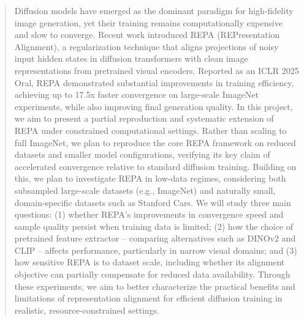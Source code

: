 \begin{abstract}
Diffusion models have emerged as the dominant paradigm for high-fidelity image generation, yet their training remains
computationally expensive and slow to converge. Recent work introduced REPA (REPresentation Alignment), a regularization
technique that aligns projections of noisy input hidden states in diffusion transformers with clean image representations
from pretrained visual encoders. Reported as an ICLR 2025 Oral, REPA demonstrated substantial improvements in training
efficiency, achieving up to 17.5x faster convergence on large-scale ImageNet experiments, while also
improving final generation quality.
In this project, we aim to present a partial reproduction and systematic extension of REPA under constrained computational settings.
Rather than scaling to full ImageNet, we plan to reproduce the core REPA framework on reduced datasets and smaller model configurations, verifying
its key claim of accelerated convergence relative to standard diffusion training. Building on this, we plan to investigate REPA in low-data
regimes, considering both subsampled large-scale datasets (e.g., ImageNet) and naturally small, domain-specific datasets such as Stanford Cars.
We will study three main questions: (1) whether REPA's improvements in convergence speed and sample quality persist when training data is
limited; (2) how the choice of pretrained feature extractor -- comparing alternatives such as DINOv2 and CLIP -- affects performance,
particularly in narrow visual domains; and (3) how sensitive REPA is to dataset scale, including whether its alignment objective can
partially compensate for reduced data availability. Through these experiments, we aim to better characterize the practical benefits
and limitations of representation alignment for efficient diffusion training in realistic, resource-constrained settings.
\end{abstract}
